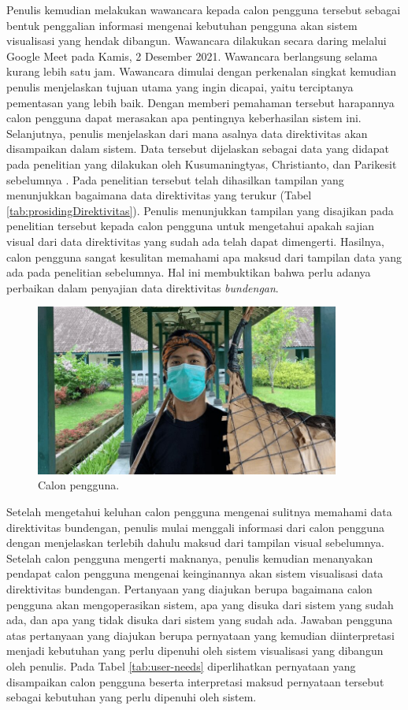 Penulis kemudian melakukan wawancara kepada calon pengguna tersebut sebagai bentuk penggalian informasi mengenai kebutuhan pengguna akan sistem visualisasi yang hendak dibangun. Wawancara dilakukan secara daring melalui Google Meet pada Kamis, 2 Desember 2021. Wawancara berlangsung selama kurang lebih satu jam. Wawancara dimulai dengan perkenalan singkat kemudian penulis menjelaskan tujuan utama yang ingin dicapai, yaitu terciptanya pementasan \bundengan yang lebih baik. Dengan memberi pemahaman tersebut harapannya calon pengguna dapat merasakan apa pentingnya keberhasilan sistem ini. Selanjutnya, penulis menjelaskan dari mana asalnya data direktivitas akan disampaikan dalam sistem. Data tersebut dijelaskan sebagai data yang didapat pada penelitian yang dilakukan oleh Kusumaningtyas, Christianto, dan Parikesit sebelumnya \cite{prosidingDirektivitas}. Pada penelitian tersebut telah dihasilkan tampilan yang menunjukkan bagaimana data direktivitas yang terukur (Tabel \ref{tab:prosidingDirektivitas}). Penulis menunjukkan tampilan yang disajikan pada penelitian tersebut kepada calon pengguna untuk mengetahui apakah sajian visual dari data direktivitas \bundengan yang sudah ada telah dapat dimengerti. Hasilnya, calon pengguna sangat kesulitan memahami apa maksud dari tampilan data yang ada pada penelitian sebelumnya. Hal ini membuktikan bahwa perlu adanya perbaikan dalam penyajian data direktivitas \emph{bundengan}. \par 

\begin{figure}[t!]
	\centering
	\includegraphics[width=10cm]{Gambar/calon-pengguna.jpg}
	\caption{Calon pengguna.}
	\label{fig:user}
\end{figure}

Setelah mengetahui keluhan calon pengguna mengenai sulitnya memahami data direktivitas bundengan, penulis mulai menggali informasi dari calon pengguna dengan menjelaskan terlebih dahulu maksud dari tampilan visual sebelumnya. Setelah calon pengguna mengerti maknanya, penulis kemudian menanyakan pendapat calon pengguna mengenai keinginannya akan sistem visualisasi data direktivitas bundengan. Pertanyaan yang diajukan berupa bagaimana calon pengguna akan mengoperasikan sistem, apa yang disuka dari sistem yang sudah ada, dan apa yang tidak disuka dari sistem yang sudah ada. Jawaban pengguna atas pertanyaan yang diajukan berupa pernyataan yang kemudian diinterpretasi menjadi kebutuhan yang perlu dipenuhi oleh sistem visualisasi yang dibangun oleh penulis. Pada Tabel \ref{tab:user-needs} diperlihatkan pernyataan yang disampaikan calon pengguna beserta interpretasi maksud pernyataan tersebut sebagai kebutuhan yang perlu dipenuhi oleh sistem. \par 

